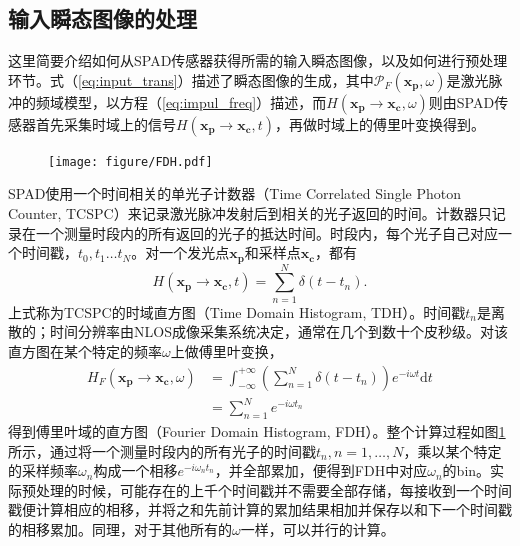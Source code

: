 \documentclass[master]{shtthesis}             %
\begin{document}
\subsection{输入瞬态图像的处理}\label{sec:input_img_proc}

这里简要介绍如何从SPAD传感器获得所需的输入瞬态图像，以及如何进行预处理环节。式（\ref{eq:input_trans}）描述了瞬态图像的生成，其中$\mathcal{P}_F(\mathbf{x_p},\omega)$是激光脉冲的频域模型，以方程（\ref{eq:impul_freq}）描述，而$H(\mathbf{x_p}\rightarrow \mathbf{x_c},\omega)$则由SPAD传感器首先采集时域上的信号$H(\mathbf{x_p}\rightarrow \mathbf{x_c},t)$，再做时域上的傅里叶变换得到。

\begin{figure}[!tb]
  \centering
  \texttt{[image: figure/FDH.pdf]}
  \label{fig:fdh}
\end{figure}

SPAD使用一个时间相关的单光子计数器（Time Correlated Single Photon Counter, TCSPC）来记录激光脉冲发射后到相关的光子返回的时间。计数器只记录在一个测量时段内的所有返回的光子的抵达时间。时段内，每个光子自己对应一个时间戳，$t_0, t_1\dots t_N$。对一个发光点$\mathbf{x_p}$和采样点$\mathbf{x_c}$，都有
\begin{equation}
  H(\mathbf{x_p}\rightarrow \mathbf{x_c},t) = \sum_{n=1}^N \delta(t-t_n).
\end{equation}
上式称为TCSPC的时域直方图（Time Domain Histogram, TDH）。时间戳$t_n$是离散的；时间分辨率由NLOS成像采集系统决定，通常在几个到数十个皮秒级。对该直方图在某个特定的频率$\omega$上做傅里叶变换，
\begin{equation}
  \begin{split}
    H_F(\mathbf{x_p}\rightarrow \mathbf{x_c},\omega) &= \int_{-\infty}^{+\infty} \left( \sum_{n=1}^N \delta(t-t_n) \right) e^{-i\omega t} \text{d}t \\
    &= \sum_{n=1}^N e^{-i\omega t_n}
  \end{split}
\end{equation}
得到傅里叶域的直方图（Fourier Domain Histogram, FDH）。整个计算过程如图\ref{fig:fdh}所示，通过将一个测量时段内的所有光子的时间戳$t_n, n=1,\dots,N$，乘以某个特定的采样频率$\omega_n$构成一个相移$e^{-i\omega_n t_n}$，并全部累加，便得到FDH中对应$\omega_n$的bin。实际预处理的时候，可能存在的上千个时间戳并不需要全部存储，每接收到一个时间戳便计算相应的相移，并将之和先前计算的累加结果相加并保存以和下一个时间戳的相移累加。同理，对于其他所有的$\omega$一样，可以并行的计算。
\end{document}
